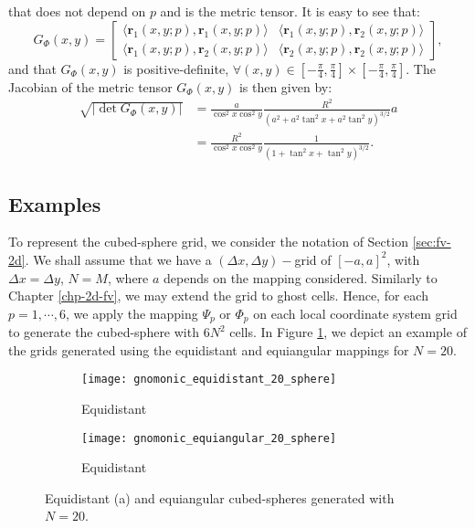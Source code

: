 that does not depend on $p$ and is the  metric tensor.
It is easy to see that:
\begin{equation}
	\label{chp3-eqangle-phi-metric-tensor}
	G_{\Phi}(x,y) = 
	\begin{bmatrix}
		\langle \boldsymbol{r}_{1}(x,y;p), \boldsymbol{r}_{1}(x,y;p) \rangle & 
		\langle \boldsymbol{r}_{1}(x,y;p), \boldsymbol{r}_{2}(x,y;p) \rangle \\
		\langle \boldsymbol{r}_{1}(x,y;p), \boldsymbol{r}_{2}(x,y;p) \rangle  &
		\langle \boldsymbol{r}_{2}(x,y;p), \boldsymbol{r}_{2}(x,y;p) \rangle 
	\end{bmatrix},
\end{equation}
and that $G_{\Phi}(x,y)$ is positive-definite, 
$\forall (x,y) \in [-\frac{\pi}{4},\frac{\pi}{4}] 
\times [-\frac{\pi}{4},\frac{\pi}{4}]$.
The Jacobian of the metric tensor $G_{\Phi}(x,y)$ is then given by:
\begin{align}
	\sqrt{|\det{G_{\Phi}(x,y)}|} &= \frac{a}{\cos^2 x \cos^2 y}
	\frac{R^2}{(a^2 + a^2\tan^2x + a^2\tan^2y)^{3/2}}a\\
	&= \frac{R^2}{\cos^2 x \cos^2 y}
	\frac{1}{(1 + \tan^2x + \tan^2y)^{3/2}}.
\end{align}	
\subsection{Examples}
To represent the cubed-sphere grid, we consider the notation of Section \ref{sec:fv-2d}.
We shall assume that we have a $(\Delta x, \Delta y)-$grid of $[-a,a]^2$, with $\Delta x= \Delta y$, $N=M$,
where $a$ depends on the mapping considered.
Similarly to Chapter \ref{chp-2d-fv}, we may extend the grid to ghost cells.
Hence, for each $p=1, \cdots, 6$, we apply the mapping $\Psi_p$ or $\Phi_p$ on
each local coordinate system grid to generate the cubed-sphere with $6N^2$ cells.
In Figure \ref{chp4-cs-grid}, we depict an example of the grids generated using 
the equidistant and equiangular mappings for $N=20$.
\begin{figure}[!htb]
	\centering
	\begin{subfigure}{0.48\textwidth}
		\centering
		\texttt{[image: gnomonic\_equidistant\_20\_sphere]}
		\caption{Equidistant}
	\end{subfigure}
	\begin{subfigure}{0.48\textwidth}
		\centering
		\texttt{[image: gnomonic\_equiangular\_20\_sphere]}
		\caption{Equidistant}
	\end{subfigure}
	\caption{Equidistant (a) and equiangular cubed-spheres generated with $N=20$.
		\label{chp4-cs-grid}}
\end{figure}

